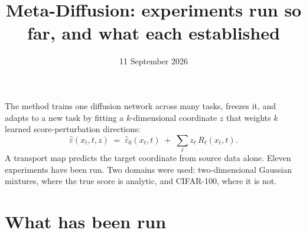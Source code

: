 \documentclass[11pt]{article}
\title{\vspace{-1.5em}Meta-Diffusion: experiments run so far, and what each established}
\date{11 September 2026}
\author{}
\begin{document}
\maketitle
\vspace{-2em}

\noindent
The method trains one diffusion network across many tasks, freezes it, and adapts to a new
task by fitting a $k$-dimensional coordinate $z$ that weights $k$ learned
score-perturbation directions:
\[
  \hat\varepsilon(x_t,t,z) \;=\; \hat\varepsilon_0(x_t,t) \;+\; \textstyle\sum_{\ell} z_\ell\,R_\ell(x_t,t).
\]
A transport map predicts the target coordinate from source data alone. Eleven experiments
have been run. Two domains were used: two-dimensional Gaussian mixtures, where the true
score is analytic, and CIFAR-100, where it is not.

\section{What has been run}
\end{document}
